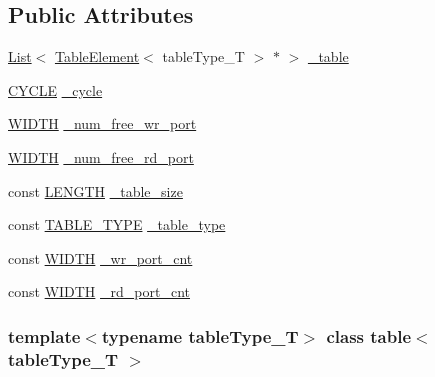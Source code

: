 \subsection*{Public Attributes}
\begin{DoxyCompactItemize}
\item 
\hyperlink{classList}{List}$<$ \hyperlink{structTableElement}{TableElement}$<$ tableType\_\-T $>$ $\ast$ $>$ \hyperlink{classtable_aea78e74d4f44c1879df0c44e69d7bc26}{\_\-table}
\item 
\hyperlink{global_2global_8h_a7e19a550ec11d1ed921deb20c22efb5b}{CYCLE} \hyperlink{classtable_a64d740f2c6bbb938aac4a89bcbd76674}{\_\-cycle}
\item 
\hyperlink{global_2global_8h_a6fa2e24b8a418fa215e183264cbea3aa}{WIDTH} \hyperlink{classtable_aa4bac855debc70614138237634c81bcd}{\_\-num\_\-free\_\-wr\_\-port}
\item 
\hyperlink{global_2global_8h_a6fa2e24b8a418fa215e183264cbea3aa}{WIDTH} \hyperlink{classtable_a81119aad0ba83d08ba21cd6d0d040347}{\_\-num\_\-free\_\-rd\_\-port}
\item 
const \hyperlink{global_2global_8h_ad7ec63c69447a2b630929c8e0197860d}{LENGTH} \hyperlink{classtable_a812d699882bfa6230532dad66a5004bd}{\_\-table\_\-size}
\item 
const \hyperlink{table_8h_ae42c42cf2da8a8d43c157d91ad4f3158}{TABLE\_\-TYPE} \hyperlink{classtable_ae804042049b8e94591efe22ae05c0371}{\_\-table\_\-type}
\item 
const \hyperlink{global_2global_8h_a6fa2e24b8a418fa215e183264cbea3aa}{WIDTH} \hyperlink{classtable_a8ce1d116f2fa5d7fd3d9177c2037cfb3}{\_\-wr\_\-port\_\-cnt}
\item 
const \hyperlink{global_2global_8h_a6fa2e24b8a418fa215e183264cbea3aa}{WIDTH} \hyperlink{classtable_a91630e4de8867734d127999fcfd60fa6}{\_\-rd\_\-port\_\-cnt}
\end{DoxyCompactItemize}
\subsubsection*{template$<$typename tableType\_\-T$>$ class table$<$ tableType\_\-T $>$}



